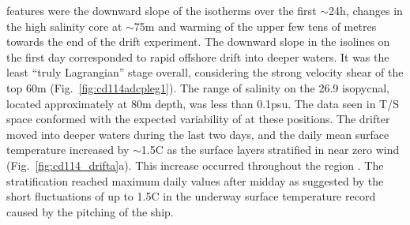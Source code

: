 features were the downward slope of the isotherms over the first
$\sim$24h, changes in the high salinity core at $\sim$75m and
warming of the upper few tens of metres towards the end of the
drift experiment. The downward slope in the isolines on the first
day corresponded to rapid offshore drift into deeper waters. It
was the least ``truly Lagrangian'' stage overall, considering the
strong velocity shear of the top 60m
(Fig.~\ref{fig:cd114adcpleg1}). The range of salinity on the 26.9
isopycnal, located approximately at 80m depth, was less than
0.1psu. The data seen in T/S space conformed with the expected
variability of \enawt at these positions. The drifter moved into
deeper waters during the last two days, and the daily mean surface
temperature increased by $\sim$1.5\deg C as the surface layers
stratified in near zero wind (Fig.~\ref{fig:cd114_drifta}a). This
increase occurred throughout the region \citep{Smyth01}. The
stratification reached maximum daily values after midday as
suggested by the short fluctuations of up to 1.5\deg C in the
underway surface temperature record caused by the pitching of the
ship.

